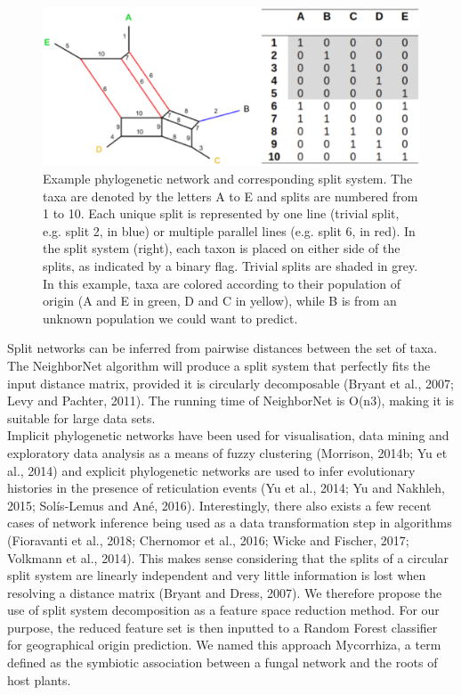 \documentclass[final]{bioinfo}
\begin{document}
\begin{figure}[]%
    \includegraphics[width=1.0\linewidth]{fig1a.eps}
    \caption{Example phylogenetic network and corresponding split system. The taxa are denoted by the letters A to E and splits are numbered from 1 to 10. Each unique split is represented by one line (trivial split, e.g. split 2, in blue) or multiple parallel lines (e.g. split 6, in red). In the split system (right), each taxon is placed on either side of the splits, as indicated by a binary flag. Trivial splits are shaded in grey. In this example, taxa are colored according to their population of origin (A and E in green, D and C in yellow), while B is from an unknown population we could want to predict.}\label{fig:01}
\end{figure}
Split networks can be inferred from pairwise distances between the set of taxa. The NeighborNet algorithm will produce a split system that perfectly fits the input distance matrix, provided it is circularly decomposable (Bryant et al., 2007; Levy and Pachter, 2011). The running time of NeighborNet is O(n3), making it is suitable for large data sets.\\
Implicit phylogenetic networks have been used  for visualisation, data mining and exploratory data analysis as a means of fuzzy clustering (Morrison, 2014b; Yu et al., 2014) and explicit phylogenetic networks are used to infer evolutionary histories in the presence of reticulation events (Yu et al., 2014; Yu and Nakhleh, 2015; Solís-Lemus and Ané, 2016). Interestingly, there also exists a few recent cases of network inference being used as a data transformation step in algorithms (Fioravanti et al., 2018; Chernomor et al., 2016; Wicke and Fischer, 2017; Volkmann et al., 2014). This makes sense considering that the splits of a circular split system are linearly independent and very little information is lost when resolving a distance matrix (Bryant and Dress, 2007). We therefore propose the use of split system decomposition as a feature space reduction method. For our purpose, the reduced feature set is then inputted to a Random Forest classifier for geographical origin prediction. We named this approach Mycorrhiza, a term defined as the symbiotic association between a fungal network and the roots of host plants.
\end{document}

